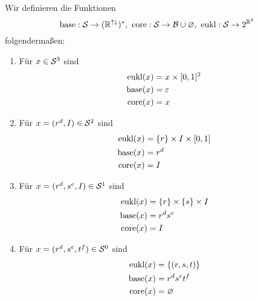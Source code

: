 \begin{bsp}
    \begin{align*}
        [3,5) &\in \einf^3\\
        (2^\upa, [0.2,1)) &\in \einf^2\\
        (2^\upa, [0,2)) &\notin \einf^2\\
        (2^\upa,0.7\downa, [0.2,1)) &\in \einf^1\\
        (2^\upa,1\downa, [0.2,1)) &\in \einf^1\\
        (2^\upa,0\downa, [0.2,1)) &\notin \einf^1\\
        (2^\upa,0.7\downa, 0.5\upa) &\in \einf^0\\
        (2^\upa,0.7\downa, 2\upa) &\notin \einf^0\\
        (2^\upa,0.7\downa, 1\upa) &\notin \einf^0
    \end{align*}
\end{bsp}


\begin{dfn}\ \\
    Wir definieren die Funktionen 
    $$\text{base}: \mathcal{S} \to (\mathbb{R}^{{\uparrow \downarrow}})^*,\ \text{core}: \mathcal{S} \to \mathcal{B} \cup {\varnothing},\ \text{eukl}: \mathcal{S} \to 2^{\mathbb{R}^3}$$
    folgendermaßen:
    \begin{enumerate}
        \item Für $x \in \mathcal{S}^3$ sind
            \begin{align*}
                \text{eukl}(x) &= x \times [0,1]^2\\
                \text{base}(x) &= \varepsilon\\
                \text{core}(x) &= x
            \end{align*}
        \item Für $x = (r^d, I) \in \mathcal{S}^2$ sind
            \begin{align*}
                \text{eukl}(x) &= \{r\} \times I \times [0,1]\\
                \text{base}(x) &= r^d\\
                \text{core}(x) &= I
            \end{align*}
        \item Für $x = (r^d, s^e, I) \in \mathcal{S}^1$ sind
            \begin{align*}
                \text{eukl}(x) &= \{r\} \times \{s\} \times I\\
                \text{base}(x) &= r^d s^e\\
                \text{core}(x) &= I
            \end{align*}
        \item Für $x = (r^d, s^e, t^f) \in \mathcal{S}^0$ sind
            \begin{align*}
                \text{eukl}(x) &= \{(r,s,t)\}\\
                \text{base}(x) &= r^d s^e t^f\\
                \text{core}(x) &= \varnothing
            \end{align*}
    \end{enumerate}
\end{dfn}

